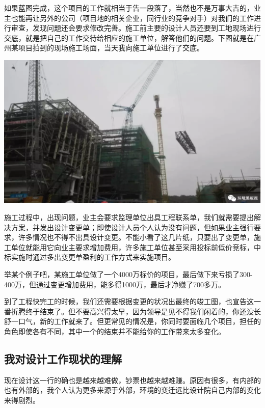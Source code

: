 \documentclass[
]{book}
\begin{document}
如果蓝图完成，这个项目的工作就相当于告一段落了，当然也不是万事大吉的，业主也能再让另外的公司（项目地的相关企业，同行业的竞争对手）对我们的工作进行审查，发现问题还会要求修改完善。施工前主要的设计人员还要到工地现场进行交底，就是把自己的工作交待给相应的施工单位，解答他们的问题。下图就是在广州某项目拍到的现场施工场面，当天我向施工单位进行了交底。

\includegraphics[width=8.33in]{images/sisi3}

施工过程中，出现问题，业主会要求监理单位出具工程联系单，我们就需要提出解决方案，并发出设计变更单；即使设计人员个人认为没有问题，但如果业主强行要求，许多情况也不得不出具设计变更。不能小看了这几片纸，只要出了变更单，施工单位就能用它向业主要求增加费用，许多施工单位甚至采用投标前低价竞标，中标实施时通过多出变更单盈利的工作方式来实施项目。

举某个例子吧，某施工单位做了一个4000万标价的项目，最后做下来亏损了300-400万，但通过变更增加费用，能多得1000万，最后才净赚了700多万。

到了工程快完工的时候，我们还需要根据变更的状况出最终的竣工图，也宣告这一番折腾终于结束了。但不要高兴得太早，因为领导是见不得我们闲着的，你还没长舒一口气，新的工作就来了。但更常见的情况是，你同时要面临几个项目，担任的角色即使各有不同，其中一个的结束并不能给你的工作带来太多变化。

\hypertarget{ux6211ux5bf9ux8bbeux8ba1ux5de5ux4f5cux73b0ux72b6ux7684ux7406ux89e3}{%
\subsection{我对设计工作现状的理解}\label{ux6211ux5bf9ux8bbeux8ba1ux5de5ux4f5cux73b0ux72b6ux7684ux7406ux89e3}}

现在设计这一行的确也是越来越难做，钞票也越来越难赚。原因有很多，有内部的也有外部的，我个人认为更多来源于外部，环境的变迁远比设计院自己内部的变化来得剧烈。
\end{document}

